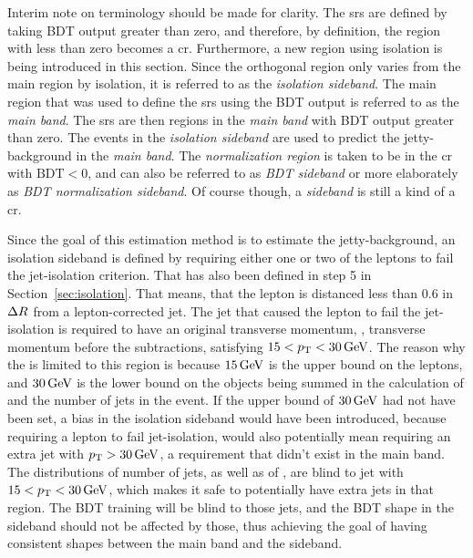 Interim note on terminology should be made for clarity. The \glspl{sr} are defined by taking BDT output greater than zero, and therefore, by definition, the region with less than zero becomes a \gls{cr}. Furthermore, a new region using isolation is being introduced in this section. Since the orthogonal region only varies from the main region by isolation, it is referred to as the \emph{isolation sideband}. The main region that was used to define the \glspl{sr} using the BDT output is referred to as the \emph{main band}. The \glspl{sr} are then regions in the \emph{main band} with BDT output greater than zero. The events in the \emph{isolation sideband} are used to predict the jetty-background in the \emph{main band}. The \emph{normalization region} is taken to be in the \gls{cr} with $\mathrm{BDT}<0$, and can also be referred to as \emph{BDT sideband} or more elaborately as \emph{BDT normalization sideband}. Of course though, a \emph{sideband} is still a kind of a \gls{cr}.

Since the goal of this estimation method is to estimate the jetty-background, an isolation sideband is defined by requiring either one or two of the leptons to fail the jet-isolation criterion. That has also been defined in step 5 in Section~\ref{sec:isolation}. That means, that the lepton is distanced less than 0.6 in $\Delta R$ from a lepton-corrected jet. The jet that caused the lepton to fail the jet-isolation is required to have an original transverse momentum, \ie, transverse momentum before the subtractions, satisfying $15<p_{\mathrm{T}}<30\,\text{Ge\hspace{-.08em}V}$. The reason why the \pt is limited to this region is because $15\,\text{Ge\hspace{-.08em}V}$ is the upper bound on the leptons, and $30\,\text{Ge\hspace{-.08em}V}$ is the lower bound on the objects being summed in the calculation of \mht and the number of jets in the event. If the upper bound of $30\,\text{Ge\hspace{-.08em}V}$ had not have been set, a bias in the isolation sideband would have been introduced, because requiring a lepton to fail jet-isolation, would also potentially mean requiring an extra jet with $p_{\mathrm{T}}>30\,\text{Ge\hspace{-.08em}V}$, a requirement that didn't exist in the main band. The distributions of number of jets, as well as of \mht, are blind to jet with $15<p_{\mathrm{T}}<30\,\text{Ge\hspace{-.08em}V}$, which makes it safe to potentially have extra jets in that region. The BDT training will be blind to those jets, and the BDT shape in the sideband should not be affected by those, thus achieving the goal of having consistent shapes between the main band and the sideband.

